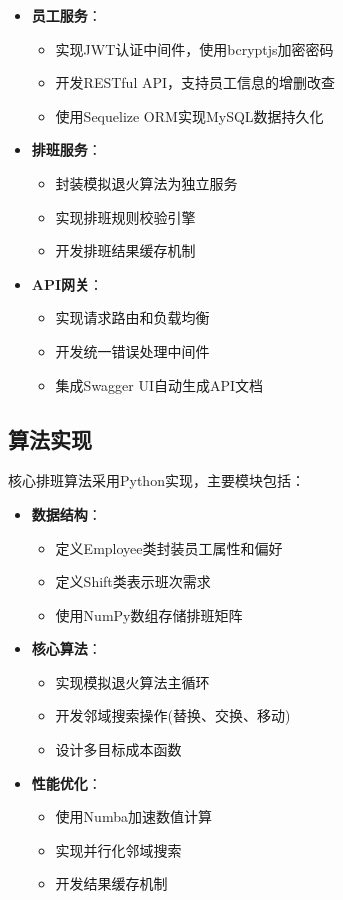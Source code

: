 \documentclass{ctexart}
\begin{document}
\begin{itemize}
    \item \textbf{员工服务}：
    \begin{itemize}
        \item 实现JWT认证中间件，使用bcryptjs加密密码
        \item 开发RESTful API，支持员工信息的增删改查
        \item 使用Sequelize ORM实现MySQL数据持久化
    \end{itemize}

    \item \textbf{排班服务}：
    \begin{itemize}
        \item 封装模拟退火算法为独立服务
        \item 实现排班规则校验引擎
        \item 开发排班结果缓存机制
    \end{itemize}

    \item \textbf{API网关}：
    \begin{itemize}
        \item 实现请求路由和负载均衡
        \item 开发统一错误处理中间件
        \item 集成Swagger UI自动生成API文档
    \end{itemize}
\end{itemize}

\subsection{算法实现}
核心排班算法采用Python实现，主要模块包括：

\begin{itemize}
    \item \textbf{数据结构}：
    \begin{itemize}
        \item 定义Employee类封装员工属性和偏好
        \item 定义Shift类表示班次需求
        \item 使用NumPy数组存储排班矩阵
    \end{itemize}

    \item \textbf{核心算法}：
    \begin{itemize}
        \item 实现模拟退火算法主循环
        \item 开发邻域搜索操作(替换、交换、移动)
        \item 设计多目标成本函数
    \end{itemize}

    \item \textbf{性能优化}：
    \begin{itemize}
        \item 使用Numba加速数值计算
        \item 实现并行化邻域搜索
        \item 开发结果缓存机制
    \end{itemize}
\end{itemize}
\end{document}
